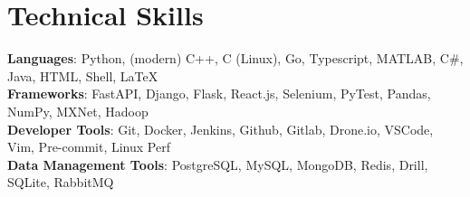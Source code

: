 \documentclass[letterpaper,11pt]{article}
\begin{document}
%
\section{Technical Skills}
 \begin{itemize}[leftmargin=0.15in, label={}]
    \small{\item{
     \textbf{Languages}{: Python, (modern) C++, C (Linux), Go, Typescript, MATLAB, C\#, Java, HTML, Shell, \LaTeX} \\
     \textbf{Frameworks}{: FastAPI, Django, Flask, React.js, Selenium, PyTest, Pandas, NumPy, MXNet, Hadoop} \\
     \textbf{Developer Tools}{: Git, Docker, Jenkins, Github, Gitlab, Drone.io, VSCode, Vim, Pre-commit, Linux Perf} \\
     \textbf{Data Management Tools}{: PostgreSQL, MySQL, MongoDB, Redis, Drill, SQLite, RabbitMQ} \\
    }}
 \end{itemize}


\end{document}
